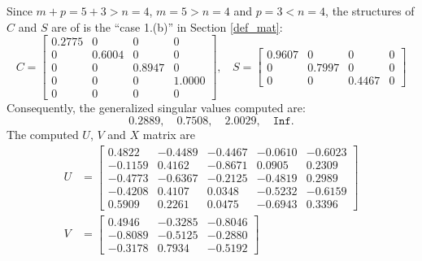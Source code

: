 \begin{example}
{\begin{enumerate}[(1).]
Since $m + p  =  5 + 3 > n = 4$, $m = 5 > n = 4$ and $p=3 < n = 4$, 
the structures of $C$ and $S$ are of is the 
``case 1.(b)'' in Section \ref{def_mat}: 
\begin{equation*}
                C = \begin{bmatrix}
                    0.2775  &       0  &       0    &     0 \\
                         0  &  0.6004  &       0    &     0 \\
                         0  &       0  &  0.8947    &     0 \\
                         0  &       0  &       0    & 1.0000 \\
                         0  &       0  &       0    &     0
                \end{bmatrix}, \ \ \ \
                S = \begin{bmatrix}
                    0.9607 &        0 &        0    &  0 \\
                         0 &   0.7997 &        0    &  0 \\
                         0 &        0 &   0.4467    &  0 
                \end{bmatrix}
            \end{equation*}
Consequently, 
the generalized singular values computed are: 
\[
0.2889, \quad
0.7508, \quad
2.0029,  \quad 
\texttt{Inf}. 
\] 
The computed $U$, $V$ and $X$ matrix are
\begin{align*}
                U &= \begin{bmatrix}
                    0.4822 &  -0.4489 &  -0.4467 &  -0.0610 &  -0.6023 \\
                   -0.1159 &   0.4162 &  -0.8671 &   0.0905 &   0.2309 \\
                   -0.4773 &  -0.6367 &  -0.2125 &  -0.4819 &   0.2989 \\
                   -0.4208 &   0.4107 &   0.0348 &  -0.5232 &  -0.6159 \\
                    0.5909 &   0.2261 &   0.0475 &  -0.6943 &   0.3396
                \end{bmatrix} \\
                V &= \begin{bmatrix}
                    0.4946 &  -0.3285 &  -0.8046 \\
                   -0.8089 &  -0.5125 &  -0.2880 \\
                   -0.3178 &   0.7934 &  -0.5192
                \end{bmatrix} \\

\end{align*}
\end{enumerate}}
\end{example}
